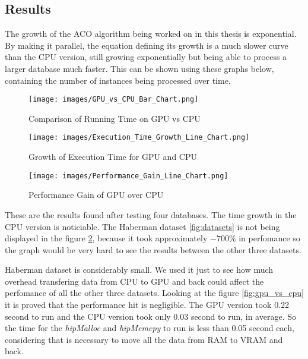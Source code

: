 \subsection{Results} \label{Results}

The growth of the ACO algorithm being worked on in this thesis is exponential.
By making it parallel, the equation defining its growth is a much slower curve than the CPU version,
still growing exponentially but being able to process a larger database much faster.
This can be shown using these graphs below, containing the number of instances being processed over time.

\begin{figure}[ht]
    \centering
    \begin{minipage}{0.48\textwidth}
        \centering
        \texttt{[image: images/GPU\_vs\_CPU\_Bar\_Chart.png]}
        \caption{Comparison of Running Time on GPU vs CPU}
        \label{fig:gpu_vs_cpu}
    \end{minipage}\hfill
    \begin{minipage}{0.48\textwidth}
        \centering
        \texttt{[image: images/Execution\_Time\_Growth\_Line\_Chart.png]}
        \caption{Growth of Execution Time for GPU and CPU}
        \label{fig:execution_time_growth}
    \end{minipage}
\end{figure}


\begin{figure}[ht]
    \centering
    \texttt{[image: images/Performance\_Gain\_Line\_Chart.png]}
    \caption{Performance Gain of GPU over CPU}
    \label{fig:performance_gain}
\end{figure}

These are the results found after testing four databases. The time growth in the CPU version is noticiable.
The Haberman dataset \ref{fig:datasets} is not being displayed in the figure \ref{fig:performance_gain}, because it took approximately $-700\%$
in perfomance so the graph would be very hard to see the results between the other three datasets.

Haberman dataset is considerably small. We used it just to see how much overhead transfering data from CPU to GPU and back
could affect the perfomance of all the other three datasets. Looking at the figure \ref{fig:gpu_vs_cpu} it is proved that
the performance hit is negligible. The GPU version took 0.22 second to run and the CPU version took only
0.03 second to run, in average. So the time for the \emph{hipMalloc} and \emph{hipMemcpy} to run is less than 0.05 second each,
considering that is necessary to move all the data from RAM to VRAM and back.
